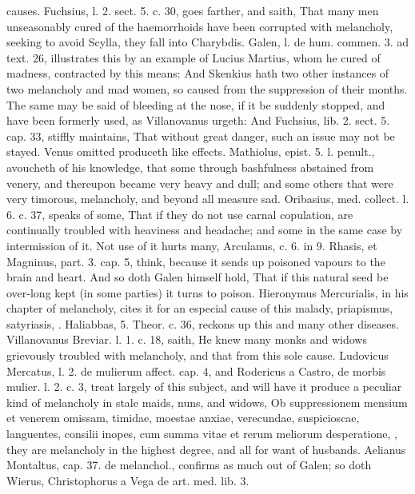 {causes. Fuchsius, l. 2. sect. 5. c. 30, goes farther, and saith,
That many men unseasonably cured of the haemorrhoids have been
corrupted with melancholy, seeking to avoid Scylla, they fall into
Charybdis. Galen, l. de hum. commen. 3. ad text. 26, illustrates this
by an example of Lucius Martius, whom he cured of madness, contracted
by this means: And  Skenkius hath two other instances of two
melancholy and mad women, so caused from the suppression of their
months. The same may be said of bleeding at the nose, if it be suddenly
stopped, and have been formerly used, as Villanovanus urgeth: And
Fuchsius, lib. 2. sect. 5. cap. 33, stiffly maintains, That
without great danger, such an issue may not be stayed.
Venus omitted produceth like effects. Mathiolus, epist. 5. l. penult.,
avoucheth of his knowledge, that some through bashfulness
abstained from venery, and thereupon became very heavy and dull; and
some others that were very timorous, melancholy, and beyond all measure
sad. Oribasius, med. collect. l. 6. c. 37, speaks of some, That
if they do not use carnal copulation, are continually troubled with
heaviness and headache; and some in the same case by intermission of
it. Not use of it hurts many, Arculanus, c. 6. in 9. Rhasis, et
Magninus, part. 3. cap. 5, think, because it sends up poisoned
vapours to the brain and heart. And so doth Galen himself hold, That if
this natural seed be over-long kept (in some parties) it turns to
poison. Hieronymus Mercurialis, in his chapter of melancholy, cites it
for an especial cause of this malady, priapismus, satyriasis, \etc{}.
Haliabbas, 5. Theor. c. 36, reckons up this and many other diseases.
Villanovanus Breviar. l. 1. c. 18, saith, He knew many monks and
widows grievously troubled with melancholy, and that from this sole
cause. Ludovicus Mercatus, l. 2. de mulierum affect. cap. 4, and
Rodericus a Castro, de morbis mulier. l. 2. c. 3, treat largely of this
subject, and will have it produce a peculiar kind of melancholy in
stale maids, nuns, and widows, Ob suppressionem mensium et venerem
omissam, timidae, moestae anxiae, verecundae, suspicioscae, languentes,
consilii inopes, cum summa vitae et rerum meliorum desperatione, \etc{},
they are melancholy in the highest degree, and all for want of
husbands. Aelianus Montaltus, cap. 37. de melanchol., confirms as much
out of Galen; so doth Wierus, Christophorus a Vega de art. med. lib. 3.
}
